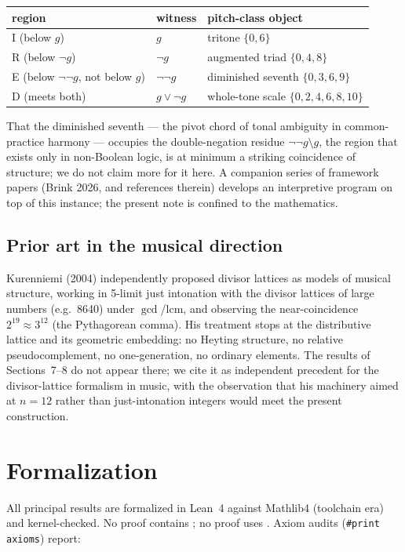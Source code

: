 ﻿\documentclass[11pt]{amsart}
\theoremstyle{plain}
\theoremstyle{definition}
\theoremstyle{remark}
\begin{document}
\begin{center}
\begin{tabular}{lll}
\toprule
region & witness & pitch-class object \\
\midrule
I (below $g$) & $g$ & tritone $\{0, 6\}$ \\
R (below $\neg g$) & $\neg g$ & augmented triad $\{0, 4, 8\}$ \\
E (below $\neg\neg g$, not below $g$) & $\neg\neg g$ &
  diminished seventh $\{0, 3, 6, 9\}$ \\
D (meets both) & $g \vee \neg g$ & whole-tone scale $\{0, 2, 4, 6, 8, 10\}$ \\
\bottomrule
\end{tabular}
\end{center}

That the diminished seventh --- the pivot chord of tonal ambiguity in
common-practice harmony --- occupies the double-negation residue
$\neg\neg g \setminus g$, the region that exists only in non-Boolean logic, is
at minimum a striking coincidence of structure; we do not claim more for it
here. A companion series of framework papers (Brink 2026, and references
therein) develops an interpretive program on top of this instance; the present
note is confined to the mathematics.

\subsection*{Prior art in the musical direction}
Kurenniemi (2004) independently proposed divisor lattices as models of musical
structure, working in 5-limit just intonation with the divisor lattices of
large numbers (e.g.\ 8640) under $\gcd$/$\mathrm{lcm}$, and observing the
near-coincidence $2^{19} \approx 3^{12}$ (the Pythagorean comma). His
treatment stops at the distributive lattice and its geometric embedding: no
Heyting structure, no relative pseudocomplement, no one-generation, no
ordinary elements. The results of Sections~7--8 do not appear there; we cite
it as independent precedent for the divisor-lattice formalism in music, with
the observation that his machinery aimed at $n = 12$ rather than
just-intonation integers would meet the present construction.

\section{Formalization}

All principal results are formalized in Lean~4 against Mathlib4 (toolchain
 era) and kernel-checked. No proof contains ; no
proof uses . Axiom audits (\texttt{\#print axioms}) report:
\end{document}
